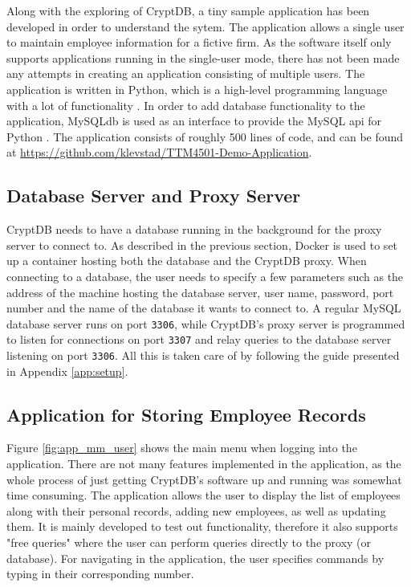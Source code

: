 Along with the exploring of CryptDB, a tiny sample application has been developed in order to understand the sytem. The application allows a single user to maintain employee information for a fictive firm. As the software itself only supports applications running in the single-user mode, there has not been made any attempts in creating an application consisting of multiple users. The application is written in Python, which is a high-level programming language with a lot of functionality \cite{python}. In order to add database functionality to the application, MySQLdb is used as an interface to provide the MySQL \gls{api} for Python \cite{mysqldb}. The application consists of roughly 500 lines of code, and can be found at \url{https://github.com/klevstad/TTM4501-Demo-Application}.

\subsection{Database Server and Proxy Server}

CryptDB needs to have a database running in the background for the proxy server to connect to. As described in the previous section, Docker is used to set up a container hosting both the database and the CryptDB proxy. When connecting to a database, the user needs to specify a few parameters such as the address of the machine hosting the database server, user name, password, port number and the name of the database it wants to connect to. A regular MySQL database server runs on port \verb!3306!, while CryptDB's proxy server is programmed to listen for connections on port \verb!3307! and relay queries to the database server listening on port \verb!3306!. All this is taken care of by following the guide presented in Appendix \ref{app:setup}.

\subsection{Application for Storing Employee Records}

Figure \ref{fig:app_mm_user} shows the main menu when logging into the application. There are not many features implemented in the application, as the whole process of just getting CryptDB's software up and running was somewhat time consuming. The application allows the user to display the list of employees along with their personal records, adding new employees, as well as updating them. It is mainly developed to test out functionality, therefore it also supports "free queries" where the user can perform queries directly to the proxy (or database). For navigating in the application, the user specifies commands by typing in their corresponding number.

